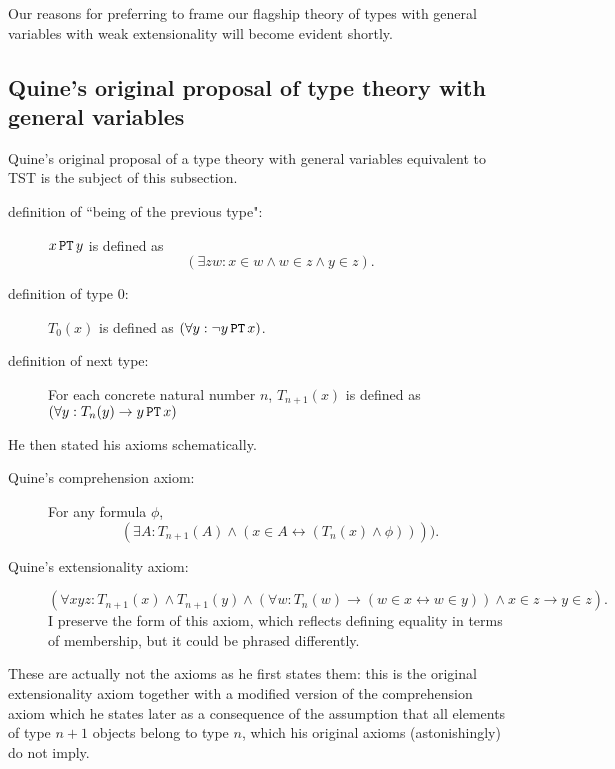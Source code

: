 \documentclass[12pt]{article}
\begin{document}
Our reasons for preferring to frame our flagship theory of types with general variables with weak extensionality will become evident shortly.

\subsection{Quine's original proposal of type theory with general variables}

Quine's original proposal of a type theory with general variables equivalent to TST is the subject of this subsection.


\begin{description}

\item[definition of ``being of the previous type":]  $x\, {\tt PT}\, y$ is defined as $$(\exists zw: x \in w \wedge w \in z \wedge y \in z).$$

\item[definition of type 0:]  $T_0(x)$ is defined as $(\forall y: \neg y\, {\tt PT}\, x)$.

\item[definition of next type:]  For each concrete natural number $n$, $T_{n+1}(x)$ is
defined as $(\forall y:  T_n(y) \rightarrow y\, {\tt PT}\, x)$

\end{description}

He then stated his axioms schematically.


\begin{description}

\item[Quine's comprehension axiom:]  For any formula $\phi$, $$(\exists A:  T_{n+1}(A) \wedge (x\in A \leftrightarrow (T_n(x) \wedge  \phi)))).$$

\item[Quine's extensionality axiom:]  $$(\forall xyz:T_{n+1}(x) \wedge  T_{n+1}(y) \wedge (\forall w:T_n(w) \rightarrow (w \in x \leftrightarrow w \in y)) \wedge x \in z \rightarrow y \in z).$$  I preserve the form of this axiom, which reflects defining equality in terms of membership, but it could be phrased differently.

\end{description}

These are actually not the axioms as he first states them:  this is the original extensionality axiom together with a modified version of the comprehension axiom which he states later as a consequence of the assumption that all elements of type $n+1$ objects belong to type $n$, which his original axioms (astonishingly) do not imply.
\end{document}
